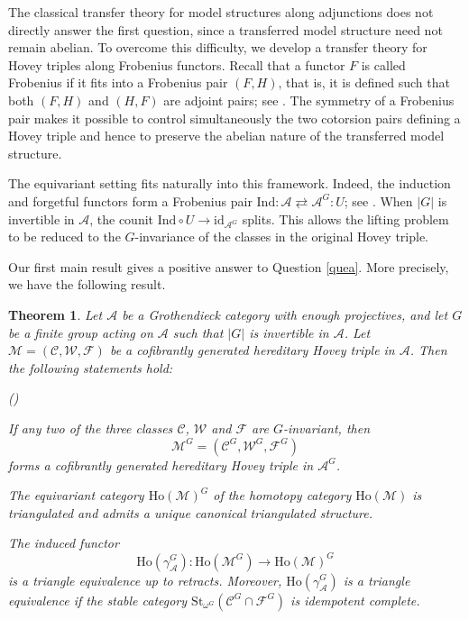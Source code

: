 \documentclass[12pt,twoside]{amsart}
\newtheorem{intthm}{Theorem}[]
\theoremstyle{bfupright head,slanted body}
\theoremstyle{bfupright head,upright body}
\theoremstyle{fixed bf head,slanted body}
\theoremstyle{fixed bf head,upright body}
\theoremstyle{numbered paragraph}
\newlength{\thmlistleft}        %
\newlength{\thmlistright}       %
\newlength{\thmlistpartopsep}   %
\newlength{\thmlisttopsep}      %
\newlength{\thmlistparsep}      %
\newlength{\thmlistitemsep}     %
\newcounter{rqm}
\newenvironment{rqm}{\begin{list}{\upshape (\arabic{rqm})}%
    {\usecounter{rqm}%
      \setlength{\leftmargin}{\thmlistleft}%
      \setlength{\labelwidth}{\thmlistleft}%
      \setlength{\rightmargin}{\thmlistright}%
      \setlength{\partopsep}{\thmlistpartopsep}%
      \setlength{\topsep}{\thmlisttopsep}%
      \setlength{\parsep}{\thmlistparsep}%
      \setlength{\itemsep}{\thmlistitemsep}}}%
  {\end{list}}%
\numberwithin{equation}{res}
\newcommand{\calA}{\mathcal{A}}
\newcommand{\id}{\mathrm{id}}
\newcommand{\Ind}{\mathrm{Ind}}
\newcommand{\Ho}{\mathrm{Ho}}
\newcommand{\St}{\mathrm{St}}
\begin{document}
The classical transfer theory for model structures along adjunctions does not directly answer the first question, since a transferred model structure need not remain abelian.
To overcome this difficulty, we develop a transfer theory for Hovey triples along Frobenius functors.
Recall that a functor $F$ is called Frobenius if it fits into a Frobenius pair $(F,H)$, that is, it is defined such that both $(F,H)$ and $(H,F)$ are adjoint pairs; see \cite{SE02,1999CJG,Morita65}.
The symmetry of a Frobenius pair makes it possible to control simultaneously the two cotorsion pairs defining a Hovey triple and hence to preserve the abelian nature of the transferred model structure.

The equivariant setting fits naturally into this framework.
Indeed, the induction and forgetful functors form a Frobenius pair $\Ind:\calA \rightleftarrows \calA^G : U$; see \cite[Lemma 4.6]{2010DGNO}.
When $|G|$ is invertible in $\calA$, the counit $\Ind\circ U \longrightarrow \id_{\calA^G}$ splits.
This allows the lifting problem to be reduced to the $G$-invariance of the classes in the original Hovey triple.

Our first main result gives a positive answer to Question \ref{quea}.
More precisely, we have the following result. 

\begin{intthm} \label{retract (Q^G,W^G,R^G)}
Let \(\mathcal A\) be a Grothendieck category with enough projectives, and let \(G\) be a finite group acting on \(\mathcal A\) such that \(|G|\) is invertible in \(\mathcal A\). Let \(\mathcal M = (\mathcal C, \mathcal W, \mathcal F)\) be a cofibrantly generated hereditary Hovey triple in \(\mathcal A\). Then the following statements hold:
\begin{rqm}
\item If any two of the three classes \(\mathcal C\), \(\mathcal W\) and \(\mathcal F\) are \(G\)-invariant, then
\[
\mathcal M^G = (\mathcal C^G, \mathcal W^G, \mathcal F^G)
\]
forms a cofibrantly generated hereditary Hovey triple in \(\mathcal A^G\).

\item The equivariant category \(\Ho(\mathcal M)^G\) of the homotopy category \(\Ho(\mathcal M)\) is triangulated and admits a unique canonical triangulated structure.

\item The induced functor
\[
\Ho(\gamma_{\mathcal A}^G):
\Ho(\mathcal M^G) \longrightarrow \Ho(\mathcal M)^G
\]
is a triangle equivalence up to retracts. Moreover, \(\Ho(\gamma_{\mathcal A}^G)\) is a triangle equivalence if the stable category
\(\St_{\omega^G}(\mathcal C^G \cap \mathcal F^G)\)
is idempotent complete.
\end{rqm}
\end{intthm}
\end{document}
